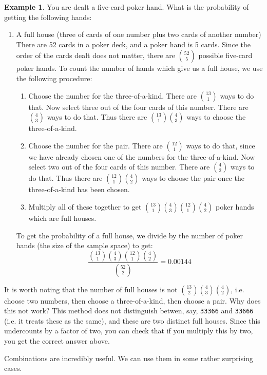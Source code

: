 \documentclass[12pt]{article}
\theoremstyle{definition}
\newtheorem*{example}{Example}
\theoremstyle{remark}
\begin{document}
\begin{example}
You are dealt a five-card poker hand. What is the probability of getting the following hands:
\begin{enumerate}
\item A full house (three of cards of one number plus two cards of another number)\\

There are 52 cards in a poker deck, and a poker hand is 5 cards. Since the order of the cards dealt does not matter, there are $\binom{52}{5}$ possible five-card poker hands. To count the number of hands which give us a full house, we use the following procedure:
\begin{enumerate}
\item Choose the number for the three-of-a-kind. There are $\binom{13}{1}$ ways to do that. Now select three out of the four cards of this number. There are $\binom{4}{3}$ ways to do that. Thus there are $\binom{13}{1}\binom{4}{3}$ ways to choose the three-of-a-kind.
\item Choose the number for the pair. There are $\binom{12}{1}$ ways to do that, since we have already chosen one of the numbers for the three-of-a-kind. Now select two out of the four cards of this number. There are $\binom{4}{2}$ ways to do that. Thus there are $\binom{12}{1}\binom{4}{2}$ ways to choose the pair once the three-of-a-kind has been chosen.
\item Multiply all of these together to get $\binom{13}{1}\binom{4}{3}\binom{12}{1}\binom{4}{2}$ poker hands which are full houses.
\end{enumerate}
To get the probability of a full house, we divide by the number of poker hands (the size of the sample space) to get:
\[
\frac{\binom{13}{1}\binom{4}{3}\binom{12}{1}\binom{4}{2}}{\binom{52}{2}} = 0.00144
\]
\end{enumerate}
It is worth noting that the number of full houses is not $\binom{13}{2}\binom{4}{3}\binom{4}{2}$, i.e. choose two numbers, then choose a three-of-a-kind, then choose a pair. Why does this not work? This method does not distinguish betwen, say, \texttt{33366} and \texttt{33666} (i.e. it treats these as the same), and these are two distinct full houses. Since this undercounts by a factor of two, you can check that if you multiply this by two, you get the correct answer above. 
\end{example}



Combinations are incredibly useful. We can use them in some rather surprising cases.
\end{document}
